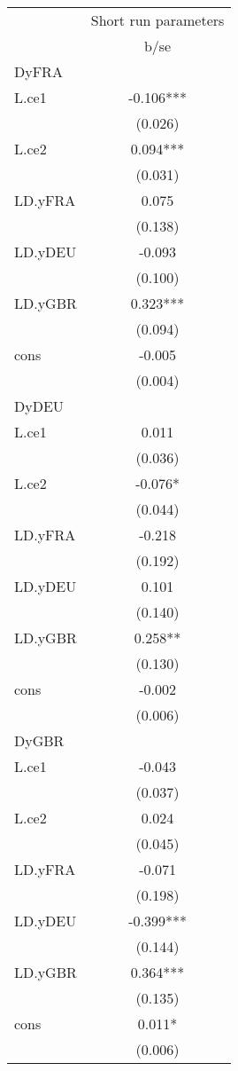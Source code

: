 \begin{tabular}{lc}\toprule
            &Short run parameters   \\
            &        b/se   \\
\midrule
DyFRA      &               \\
L.ce1      &      -0.106***\\
            &     (0.026)   \\
L.ce2      &       0.094***\\
            &     (0.031)   \\
LD.yFRA     &       0.075   \\
            &     (0.138)   \\
LD.yDEU     &      -0.093   \\
            &     (0.100)   \\
LD.yGBR     &       0.323***\\
            &     (0.094)   \\
cons       &      -0.005   \\
            &     (0.004)   \\
\midrule
DyDEU      &               \\
L.ce1      &       0.011   \\
            &     (0.036)   \\
L.ce2      &      -0.076*  \\
            &     (0.044)   \\
LD.yFRA     &      -0.218   \\
            &     (0.192)   \\
LD.yDEU     &       0.101   \\
            &     (0.140)   \\
LD.yGBR     &       0.258** \\
            &     (0.130)   \\
cons       &      -0.002   \\
            &     (0.006)   \\
\midrule
DyGBR      &               \\
L.ce1      &      -0.043   \\
            &     (0.037)   \\
L.ce2      &       0.024   \\
            &     (0.045)   \\
LD.yFRA     &      -0.071   \\
            &     (0.198)   \\
LD.yDEU     &      -0.399***\\
            &     (0.144)   \\
LD.yGBR     &       0.364***\\
            &     (0.135)   \\
cons       &       0.011*  \\
            &     (0.006)   \\
\bottomrule \end{tabular} \\ 
